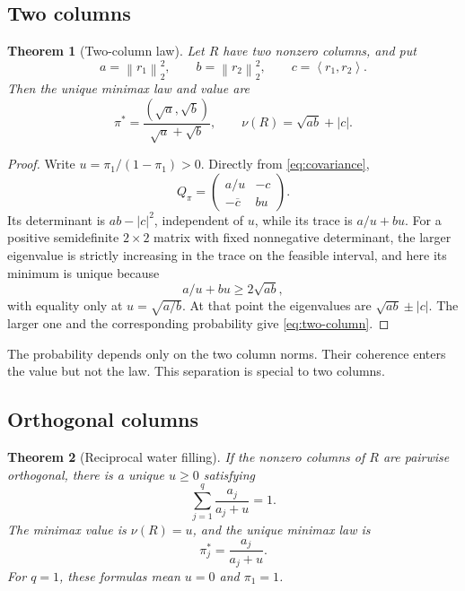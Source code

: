 \documentclass[11pt]{article}
\newtheorem{theorem}{Theorem}[section]
\theoremstyle{definition}
\newcommand{\norm}[1]{\left\lVert #1\right\rVert}
\newcommand{\inner}[2]{\left\langle #1,#2\right\rangle}
\begin{document}
\subsection{Two columns}

\begin{theorem}[Two-column law]
\label{thm:two-column}
Let $R$ have two nonzero columns, and put
\[
  a=\norm{r_1}_2^2,\qquad b=\norm{r_2}_2^2,
  \qquad c=\inner{r_1}{r_2}.
\]
Then the unique minimax law and value are
\begin{equation}
  \pi^*=\frac{(\sqrt a,\sqrt b)}{\sqrt a+\sqrt b},
  \qquad
  \nu(R)=\sqrt{ab}+|c|.
  \label{eq:two-column}
\end{equation}
\end{theorem}

\begin{proof}
Write $u=\pi_1/(1-\pi_1)>0$.  Directly from \eqref{eq:covariance},
\[
  Q_\pi=
  \begin{pmatrix}
    a/u&-c\\
    -\overline c&bu
  \end{pmatrix}.
\]
Its determinant is $ab-|c|^2$, independent of $u$, while its trace is $a/u+bu$.  For a
positive semidefinite $2\times2$ matrix with fixed nonnegative determinant, the larger eigenvalue
is strictly increasing in the trace on the feasible interval, and here its minimum is unique because
\[
  a/u+bu\ge2\sqrt{ab},
\]
with equality only at $u=\sqrt{a/b}$.  At that point the eigenvalues are
$\sqrt{ab}\pm|c|$.  The larger one and the corresponding probability give
\eqref{eq:two-column}.
\end{proof}

The probability depends only on the two column norms.  Their coherence enters the value but not
the law.  This separation is special to two columns.

\subsection{Orthogonal columns}

\begin{theorem}[Reciprocal water filling]
\label{thm:orthogonal}
If the nonzero columns of $R$ are pairwise orthogonal, there is a unique $u\ge0$ satisfying
\begin{equation}
  \sum_{j=1}^q\frac{a_j}{a_j+u}=1.
  \label{eq:water-equation}
\end{equation}
The minimax value is $\nu(R)=u$, and the unique minimax law is
\begin{equation}
  \pi_j^*=\frac{a_j}{a_j+u}.
  \label{eq:water-law}
\end{equation}
For $q=1$, these formulas mean $u=0$ and $\pi_1=1$.
\end{theorem}
\end{document}
